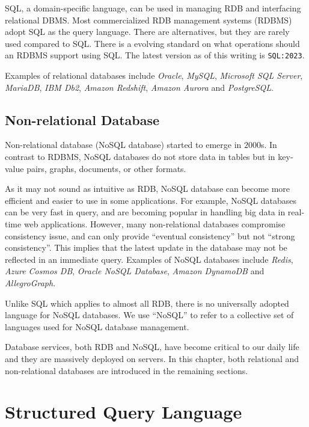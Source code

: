 SQL, a domain-specific language, can be used in managing RDB and interfacing relational DBMS.  Most commercialized RDB management systems (RDBMS) adopt SQL as the query language. There are alternatives, but they are rarely used compared to SQL. There is a evolving standard on what operations should an RDBMS support using SQL. The latest version as of this writing is \verb|SQL:2023|.

Examples of relational databases include \textit{Oracle}, \textit{MySQL}, \textit{Microsoft SQL Server}, \textit{MariaDB}, \textit{IBM Db2}, \textit{Amazon Redshift}, \textit{Amazon Aurora} and \textit{PostgreSQL}.

\subsection{Non-relational Database}

Non-relational database (NoSQL database) started to emerge in $2000$s. In contrast to RDBMS, NoSQL databases do not store data in tables but in key-value pairs, graphs, documents, or other formats.

As it may not sound as intuitive as RDB, NoSQL database can become more efficient and easier to use in some applications. For example, NoSQL databases can be very fast in query, and are becoming popular in handling big data in real-time web applications. However, many non-relational databases compromise consistency issue, and can only provide ``eventual consistency'' but not ``strong consistency''. This implies that the latest update in the database may not be reflected in an immediate query. Examples of NoSQL databases include \textit{Redis}, \textit{Azure Cosmos DB}, \textit{Oracle NoSQL Database}, \textit{Amazon DynamoDB} and \textit{AllegroGraph}.

Unlike SQL which applies to almost all RDB, there is no universally adopted language for NoSQL databases. We use ``NoSQL'' to refer to a collective set of languages used for NoSQL database management.

Database services, both RDB and NoSQL, have become critical to our daily life and they are massively deployed on servers. In this chapter, both relational and non-relational databases are introduced in the remaining sections.

\section{Structured Query Language}

